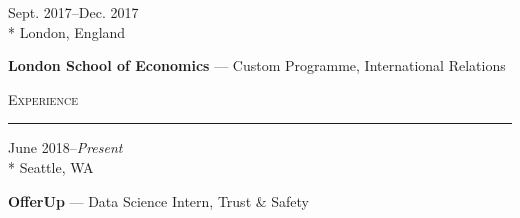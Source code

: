\documentclass[a4paper,9pt]{article}
\begin{document}
\vspace{-3ex}
\begin{minipage}[t]{0.20\linewidth}
	\begin{small}
		\begin{spacing}{1.10}
			\begin{flushright}
				Sept. 2017--Dec. 2017
				\\*
				\vspace*{2.5pt}
				London, England
			\end{flushright}
		\end{spacing}
	\end{small}
\end{minipage}
\hspace{4mm}
\begin{minipage}[t]{0.75\linewidth}
	\begin{small}
		\begin{spacing}{1.10}
			\begin{flushleft}
				\textbf{London School of Economics} --- Custom Programme, International Relations
			\end{flushleft}
		\end{spacing}
	\end{small}
\end{minipage}

\vspace{-6ex}
\vspace*{25pt}

\begin{Large}
	\textsc{Experience}
\end{Large}
\vspace*{5pt}
\hrule
\vspace*{5pt}

\vspace{1ex}	
\begin{minipage}[t]{0.20\linewidth}
	\begin{small}
		\begin{spacing}{1.00}
			\begin{flushright}
				June 2018--\textit{Present}
				\\*
				\vspace*{2.5pt}
				Seattle, WA
			\end{flushright}
		\end{spacing}
	\end{small}
\end{minipage}
\hspace{4mm}
\begin{minipage}[t]{0.75\linewidth}
	\begin{small}
		\begin{spacing}{1.00}
			\begin{flushleft}
				\textbf{OfferUp} --- Data Science Intern, Trust \& Safety
			\end{flushleft}
		\end{spacing}
	\end{small}
\end{minipage}
\end{document}
